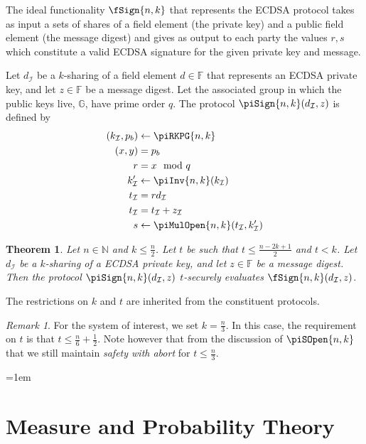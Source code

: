 \documentclass{article}
\newtheorem{theorem}{Theorem}
\theoremstyle{remark}
\newtheorem{remark}{Remark}
\newcommand{\N}{\mathbb{N}}
\newcommand{\F}{\mathbb{F}}
\newcommand{\G}{\mathbb{G}}
\begin{document}
The ideal functionality $\fSign{n,k}$ that represents the ECDSA protocol takes
as input a sets of shares of a field element (the private key) and a public
field element (the message digest) and gives as output to each party the values
$r, s$ which constitute a valid ECDSA signature for the given private key and
message.

Let $d_\mathcal{I}$ be a $k$-sharing of a field element $d \in \F$ that
represents an ECDSA private key, and let $z \in \F$ be a message digest. Let
the associated group in which the public keys live, $\G$, have prime order $q$.
The protocol $\piSign{n,k}(d_\mathcal{I}, z)$ is defined by
\begin{align*}
	(k_\mathcal{I}, p_b) &\leftarrow \piRKPG{n,k}\\
	(x, y) &= p_b\\
	r &= x \mod q\\
	k'_\mathcal{I} &\leftarrow \piInv{n,k}(k_\mathcal{I})\\
	t_\mathcal{I} &= rd_\mathcal{I}\\
	t_\mathcal{I} &= t_\mathcal{I} + z_\mathcal{I}\\
	s &\leftarrow \piMulOpen{n,k}(t_\mathcal{I}, k'_\mathcal{I})
\end{align*}

\begin{theorem}
	Let $n \in \N$ and $k \le \frac{n}{2}$. Let $t$ be such that $t \le \frac{n
	- 2k + 1}{2}$ and $t < k$. Let $d_\mathcal{I}$ be a $k$-sharing of a ECDSA
	private key, and let $z \in \F$ be a message digest. Then the protocol
	$\piSign{n,k}(d_\mathcal{I}, z)$ $t$-securely evaluates
	$\fSign{n,k}(d_\mathcal{I}, z)$.
\end{theorem}
The restrictions on $k$ and $t$ are inherited from the constituent protocols.

\begin{remark}
	For the system of interest, we set $k = \frac{n}{3}$. In this case, the
	requirement on $t$ is that $t \le \frac{n}{6} + \frac{1}{2}$. Note however
	that from the discussion of $\piSOpen{n,k}$ that we still maintain
	\textit{safety with abort} for $t \le \frac{n}{3}$.
\end{remark}

\newpage
{%
	\emergencystretch=1em

	\printbibliography{}
}

\newpage
\appendix

\section{Measure and Probability Theory}\label{app:prob}
\end{document}
